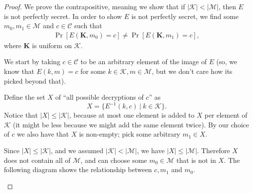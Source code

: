 \documentclass[11pt]{article}
\newcommand{\msgs}{\mathcal{M}}
\newcommand{\ctxts}{\mathcal{C}}
\newcommand{\keys}{\mathcal{K}}
\newcommand{\enc}{E}
\newcommand{\bK}{\mathbf{K}}
\begin{document}
\begin{proof}
    We prove the contrapositive, meaning we show that if $|\keys| < |\msgs|$,
    then $E$ is not perfectly secret. In order to show $E$ is not perfectly
    secret, we find some $m_0,m_1\in\msgs$ and $c\in\ctxts$ such that
    \begin{align}\label{neqprob}
        \Pr[\enc(\bK,m_0) = c] \neq \Pr[\enc(\bK,m_1) = c],
    \end{align}
    where $\bK$ is uniform on $\keys$.

    We start by taking $c\in\ctxts$ to be an arbitrary element of the image of
    $E$ (so, we know that $E(k,m)=c$ for some $k\in\keys,m\in\msgs$, but we
    don't care how its picked beyond that).

    Define the set $X$ of ``all possible decryptions of $c$'' as
    \[
        X = \{E^{-1}(k,c) \ | \ k\in\keys \}.
    \]
    Notice that $|X| \leq |\keys|$, because at most one element is added to $X$
    per element of $\keys$ (it might be less because we might add the same
    element twice). By our choice of $c$ we also have that $X$ is non-empty;
    pick some arbitrary $m_1\in X$.

    Since $|X| \leq |\keys|$, and we assumed $|\keys| < |\msgs|$, we have
    $|X| \leq |\msgs|$. Therefore $X$ does not contain all of $\msgs$, and
    can choose some $m_0 \in \msgs$ that is not in $X$.
    The following diagram shows the relationship between $c,m_1$ and $m_0$.
    \begin{center}
\end{center}
\end{proof}
\end{document}

